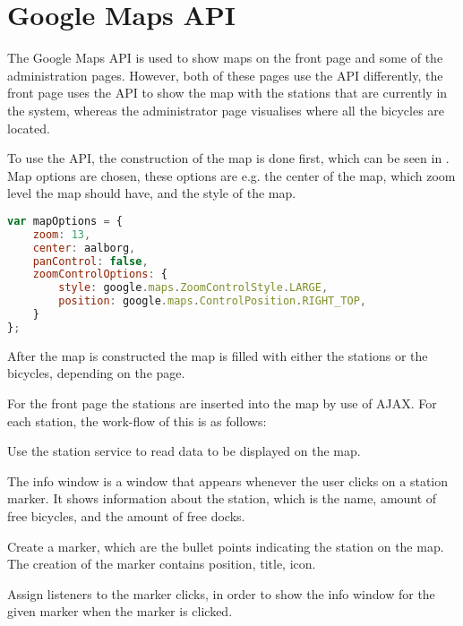 \section{Google Maps API}\label{sec:googlemapsapi}
The Google Maps API \citep{misc:googlemapsapi} is used to show maps on the front page and some of the administration pages.
However, both of these pages use the API differently, the front page uses the API to show the map with the stations that are currently in the system, whereas the administrator page visualises where all the bicycles are located.

To use the API, the construction of the map is done first, which can be seen in .
Map options are chosen, these options are e.g. the center of the map, which zoom level the map should have, and the style of the map.

\begin{minipage}{\textwidth}
\begin{lstlisting}[caption={Construction of the map.}, label={lst:mapoptions}, language=Javascript]
var mapOptions = {
	zoom: 13,
	center: aalborg,
	panControl: false,
    zoomControlOptions: {
		style: google.maps.ZoomControlStyle.LARGE,
		position: google.maps.ControlPosition.RIGHT_TOP,
	}
};
\end{lstlisting}
\end{minipage}

After the map is constructed the map is filled with either the stations or the bicycles, depending on the page.

For the front page the stations are inserted into the map by use of AJAX.
For each station, the work-flow of this is as follows:

\begin{description}[style=nextline]
	\item[Gather data]
	Use the station service to read data to be displayed on the map.
	\item[Create info window]
	The info window is a window that appears whenever the user clicks on a station marker.
	It shows information about the station, which is the name, amount of free bicycles, and the amount of free docks.
	\item[Marker creation]
	Create a marker, which are the bullet points indicating the station on the map.
	The creation of the marker contains position, title, icon.
	\item[Assign listeners]
	Assign listeners to the marker clicks, in order to show the info window for the given marker when the marker is clicked.
\end{description}

